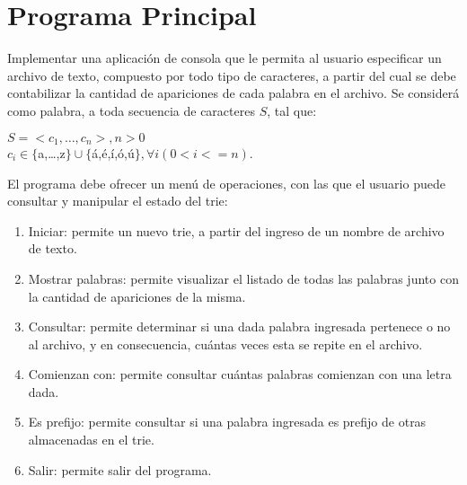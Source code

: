 \documentclass[12pt,a4paper]{article}
\begin{document}
\section{Programa Principal}
Implementar una aplicación de consola que le permita al usuario especificar un archivo de texto, compuesto por todo tipo de caracteres, a partir del cual se debe contabilizar la cantidad de apariciones de cada palabra en el archivo. Se considerá como palabra, a toda secuencia de caracteres $S$, tal que:
\begin{center}
$S=<c_1,\dots,c_n>, n>0$\\
$c_i \in \{$a,\dots,z$\} \cup \{$á,é,í,ó,ú$\}, \forall{i} (0<i<=n)$.
\end{center}

El programa debe ofrecer un menú de operaciones, con las que el usuario puede consultar y manipular el estado del trie:
\begin{enumerate}	
	\item Iniciar: permite un nuevo trie, a partir del ingreso de un nombre de archivo de texto.
	
	\item Mostrar palabras: permite visualizar el listado de todas las palabras junto con la cantidad de apariciones de la misma.
	
	\item Consultar: permite determinar si una dada palabra ingresada pertenece o no al archivo, y en consecuencia, cuántas veces esta se repite en el archivo.
	
	\item Comienzan con: permite consultar cuántas palabras comienzan con una letra dada.
	
	\item Es prefijo: permite consultar si una palabra ingresada es prefijo de otras almacenadas en el trie.
	
	\item Salir: permite salir del programa.
\end{enumerate}
	
\end{document}
